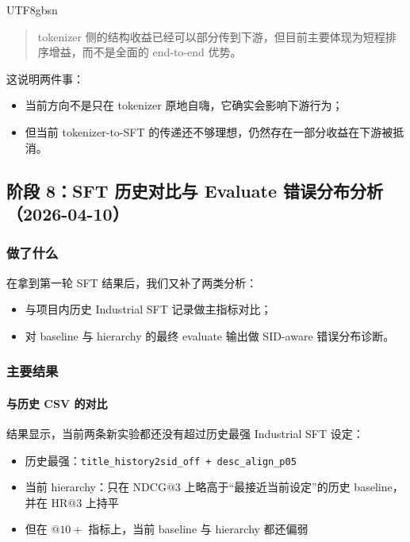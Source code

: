 \documentclass[11pt]{article}
\begin{document}
\begin{CJK*}{UTF8}{gbsn}
\begin{quote}
tokenizer 侧的结构收益已经可以部分传到下游，但目前主要体现为短程排序增益，而不是全面的 end-to-end 优势。
\end{quote}

这说明两件事：

\begin{itemize}
  \item 当前方向不是只在 tokenizer 原地自嗨，它确实会影响下游行为；
  \item 但当前 tokenizer-to-SFT 的传递还不够理想，仍然存在一部分收益在下游被抵消。
\end{itemize}

\subsection{阶段 8：SFT 历史对比与 Evaluate 错误分布分析（2026-04-10）}

\subsubsection*{做了什么}

在拿到第一轮 SFT 结果后，我们又补了两类分析：

\begin{itemize}
  \item 与项目内历史 Industrial SFT 记录做主指标对比；
  \item 对 baseline 与 hierarchy 的最终 evaluate 输出做 SID-aware 错误分布诊断。
\end{itemize}

\subsubsection*{主要结果}

\paragraph{与历史 CSV 的对比}

结果显示，当前两条新实验都还没有超过历史最强 Industrial SFT 设定：

\begin{itemize}
  \item 历史最强：\texttt{title\_history2sid\_off + desc\_align\_p05}
  \item 当前 hierarchy：只在 \(\mathrm{NDCG}@3\) 上略高于“最接近当前设定”的历史 baseline，并在 \(\mathrm{HR}@3\) 上持平
  \item 但在 \( @10+ \) 指标上，当前 baseline 与 hierarchy 都还偏弱
\end{itemize}


\end{CJK*}
\end{document}
